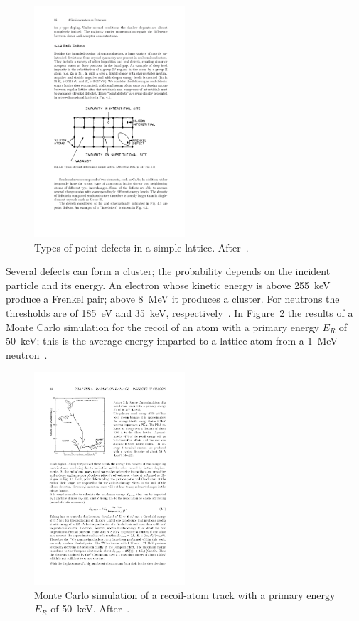 \begin{figure}[!htbp]
\centering
\includegraphics[width=0.5\textwidth]{Interstitial.pdf}
\caption{\label{fig:Interstitial}Types of point defects in a simple lattice. After~\cite{Lutz:411172}.}
\end{figure}


Several defects can form a cluster; the probability 
depends on the incident particle and its energy. 
An electron whose kinetic energy is above 255~keV produce a Frenkel pair; above 8~MeV it 
produces a cluster. For neutrons the thresholds are of 185~eV and 35~keV, 
respectively~\cite{moll-thesis}. In Figure~\ref{fig:clusters} the results of a Monte Carlo simulation 
for the recoil of an atom with a primary energy $E_R$ of 50~keV; this is the average energy imparted 
to a lattice atom from a 1~MeV neutron~\cite{moll-thesis}.


\begin{figure}[!htbp]
\centering
\includegraphics[width=0.5\textwidth]{clusters.pdf}
\caption{\label{fig:clusters}Monte Carlo simulation of a recoil-atom track with a primary energy $E_R$
of 50~keV. After~\cite{van1980mechanisms}.}
\end{figure}


